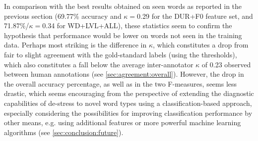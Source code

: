 	
	In comparison with the best results obtained on seen words as reported in the previous section 
	(69.77\% accuracy and $\kappa=$0.29 for the DUR+F0 feature set, and 71.87\%/$\kappa=$0.34 for WD+LVL+ALL),
	 these statistics seem to confirm the hypothesis that performance would be lower on words not seen in the training data. Perhaps most striking is the difference in $\kappa$, which constitutes a drop from fair to slight agreement with the gold-standard labels (using the \textcite{Landis1977} thresholds), which also constitutes a fall below the average inter-annotator $\kappa$ of 0.23 observed between human annotations (see \cref{sec:agreement:overall}). However, the drop in the overall accuracy percentage, as well as in the two F-measures, seems less drastic, which seems encouraging from the perspective of extending the diagnostic capabilities of de-stress to novel word types using a classification-based approach, especially considering the possibilities for improving classification performance by other means, e.g. using additional features or more powerful machine learning algorithms (see \cref{sec:conclusion:future}).
	
	
		
		
	

	
	

		
		

	
	






	
	
	
	 
